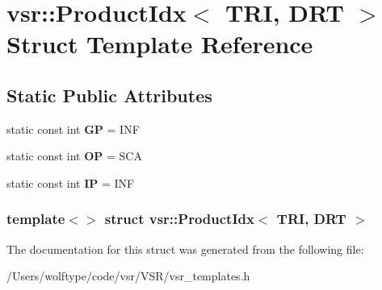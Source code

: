 \hypertarget{structvsr_1_1_product_idx_3_01_t_r_i_00_01_d_r_t_01_4}{\section{vsr\-:\-:Product\-Idx$<$ T\-R\-I, D\-R\-T $>$ Struct Template Reference}
\label{structvsr_1_1_product_idx_3_01_t_r_i_00_01_d_r_t_01_4}
}
\subsection*{Static Public Attributes}
\begin{DoxyCompactItemize}
\item 
\hypertarget{structvsr_1_1_product_idx_3_01_t_r_i_00_01_d_r_t_01_4_a089d7895f87845577c96604689d5c143}{static const int {\bfseries G\-P} = I\-N\-F}\label{structvsr_1_1_product_idx_3_01_t_r_i_00_01_d_r_t_01_4_a089d7895f87845577c96604689d5c143}

\item 
\hypertarget{structvsr_1_1_product_idx_3_01_t_r_i_00_01_d_r_t_01_4_ab163e73ea400c55dc7a1f802adac2f10}{static const int {\bfseries O\-P} = S\-C\-A}\label{structvsr_1_1_product_idx_3_01_t_r_i_00_01_d_r_t_01_4_ab163e73ea400c55dc7a1f802adac2f10}

\item 
\hypertarget{structvsr_1_1_product_idx_3_01_t_r_i_00_01_d_r_t_01_4_a61efafe036389fc9f8920cefb2dbf00f}{static const int {\bfseries I\-P} = I\-N\-F}\label{structvsr_1_1_product_idx_3_01_t_r_i_00_01_d_r_t_01_4_a61efafe036389fc9f8920cefb2dbf00f}

\end{DoxyCompactItemize}
\subsubsection*{template$<$$>$ struct vsr\-::\-Product\-Idx$<$ T\-R\-I, D\-R\-T $>$}



The documentation for this struct was generated from the following file\-:\begin{DoxyCompactItemize}
\item 
/\-Users/wolftype/code/vsr/\-V\-S\-R/vsr\-\_\-templates.\-h\end{DoxyCompactItemize}
